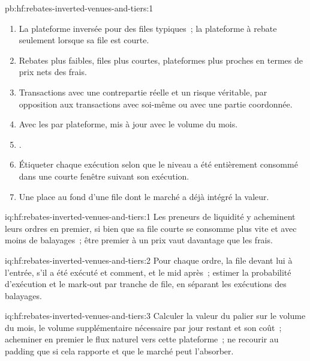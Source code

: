 \begin{solution}{pb:hf:rebates-inverted-venues-and-tiers:1}
\begin{enumerate}
jour de volume naturel.
\item La plateforme inversée pour des files typiques~; la plateforme à rebate seulement lorsque sa file est courte.
\item Rebates plus faibles, files plus courtes, plateformes plus proches en termes de prix nets des frais.
\item Transactions avec une contrepartie réelle et un risque véritable, par opposition aux transactions avec soi-même ou avec une partie coordonnée.
\item Avec les  par plateforme, mis à jour avec le volume du mois.
\item {}.
\item Étiqueter chaque exécution selon que le niveau a été entièrement consommé dans une courte fenêtre suivant son exécution.
\item Une place au fond d'une file dont le marché a déjà intégré la valeur.
\end{enumerate}
\end{solution}

\begin{solution}{iq:hf:rebates-inverted-venues-and-tiers:1}
Les preneurs de liquidité y acheminent leurs ordres en premier, si bien que sa file courte se consomme plus vite et avec moins de balayages~; être premier à un prix vaut davantage que les frais.
\end{solution}

\begin{solution}{iq:hf:rebates-inverted-venues-and-tiers:2}
Pour chaque ordre, la file devant lui à l'entrée, s'il a été exécuté et comment, et le mid après~; estimer la probabilité d'exécution et le mark-out par tranche de file,
en séparant les exécutions des balayages.
\end{solution}

\begin{solution}{iq:hf:rebates-inverted-venues-and-tiers:3}
Calculer la valeur du palier sur le volume du mois, le volume supplémentaire nécessaire par jour restant et son coût~; acheminer en premier le flux naturel vers cette plateforme~; ne recourir au padding que si
cela rapporte et que le marché peut l'absorber.
\end{solution}

